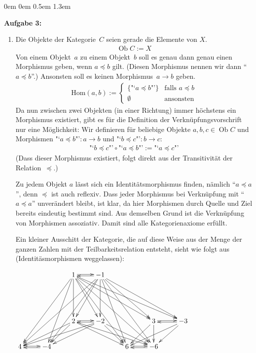\documentclass[a4paper,ngerman]{scrartcl}
\theoremstyle{definition}
\theoremstyle{plain}
\theoremstyle{remark}
\newcommand{\Hom}{\mathrm{Hom}}
\DeclareMathOperator{\Ob}{Ob}
\begin{document}
\begin{list}{}{0em \leftmargin0em \itemindent0.5em \itemsep 1.3em}
\item[\textbf{Aufgabe 3:}]\mbox{}
\begin{enumerate}
\item
Die Objekte der Kategorie~$C$ seien gerade die Elemente von $X$.
\begin{align*}
\Ob C := X
\end{align*}
Von einem Objekt~$a$ zu einem Objekt~$b$ soll es genau dann genau einen Morphismus geben, wenn $a\preceq b$ gilt. (Diesen Morphismus nennen wir dann "`$a\preceq b$"'.) Ansonsten soll es keinen Morphismus~$a\to b$ geben.
\begin{align*}
\Hom(a,b) :=
\begin{cases}
\{\text{"`$a\preceq b$"'}\} & \text{falls } a\preceq b \\
\emptyset & \text{ansonsten}
\end{cases}
\end{align*}
Da nun zwischen zwei Objekten (in einer Richtung) immer höchstens ein Morphismus existiert, gibt es für die Definition der Verknüpfungsvorschrift nur eine Möglichkeit: Wir definieren für beliebige Objekte $a,b,c\in \Ob C$ und Morphismen $\text{"`$a\preceq b$"'}:a\to b$ und $\text{"`$b\preceq c$"'}:b\to c$:
\begin{align*}
\text{"`$b\preceq c$"'}\circ \text{"`$a\preceq b$"'} := \text{"`$a\preceq c$"'}
\end{align*}
(Dass dieser Morphismus existiert, folgt direkt aus der Transitivität der Relation~$\preceq$.)

Zu jedem Objekt $a$ lässt sich ein Identitätsmorphismus finden, nämlich "`$a\preceq a$"', denn $\preceq$ ist auch reflexiv. Dass jeder Morphismus bei Verknüpfung mit "`$a\preceq a$"' unverändert bleibt, ist klar, da hier Morphismen durch Quelle und Ziel bereits eindeutig bestimmt sind. Aus demselben Grund ist die Verknüpfung von Morphismen assoziativ. Damit sind alle Kategorienaxiome erfüllt.

Ein kleiner Ausschitt der Kategorie, die auf diese Weise aus der Menge der ganzen Zahlen mit der Teilbarkeitsrelation entsteht, sieht wie folgt aus (Identitäsmorphismen weggelassen):
\begin{center}
$\xymatrix {
 & & 1\ar@<0.25ex>[r] \ar[dddll]\ar[dddl] \ar[dd]\ar[ddr] \ar[ddrrr]\ar[ddrrrr] \ar[dddrr]\ar[dddrrr] & -1\ar@<0.25ex>[l] \ar[dddlll]\ar[dddll] \ar[ddl]\ar[dd] \ar[ddrr]\ar[ddrrr] \ar[dddr]\ar[dddrr] & & & \\ \\
 & & 2\ar@<0.25ex>[r] \ar[dll]\ar[dl] \ar[drr]\ar[drrr] & -2\ar@<0.25ex>[l] \ar[dlll]\ar[dll] \ar[dr]\ar[drr] & & 3\ar@<0.25ex>[r] \ar[dl]\ar[d] & -3\ar@<0.25ex>[l] \ar[dll]\ar[dl]\\
4\ar@<0.25ex>[r] & -4\ar@<0.25ex>[l] & & & 6\ar@<0.25ex>[r] & -6\ar@<0.25ex>[l] & & &
}$
\end{center}



\end{enumerate}
\end{list}
\end{document}

